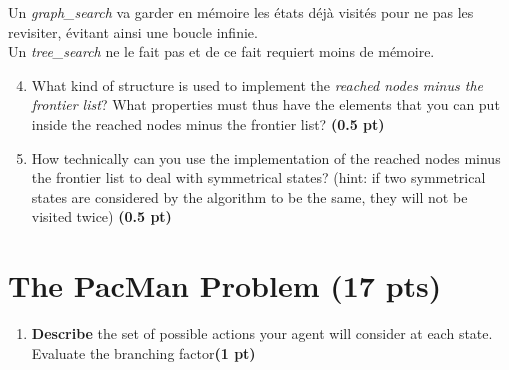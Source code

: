 \documentclass[11pt,a4paper]{../template/report}
\begin{document}
\begin{answer}
Un \textit{graph\_search} va garder en mémoire les états déjà visités pour ne pas les revisiter, évitant ainsi une boucle infinie. \\
Un \textit{tree\_search} ne le fait pas et de ce fait requiert moins de mémoire.
\end{answer}



\begin{enumerate}
\setcounter{enumi}{3}
    \item What kind of structure is used to implement the \textit{reached nodes minus the frontier list}? What properties must thus have the elements that you can
	put inside the reached nodes minus the frontier list? \textbf{(0.5 pt)}
\end{enumerate}

\begin{answer}
\end{answer}



\begin{enumerate}
\setcounter{enumi}{4}
    \item How technically can you use the implementation of the reached nodes minus the frontier list to deal with symmetrical states? (hint: if two symmetrical states are considered by the algorithm to be the same, they will not be visited twice) \textbf{(0.5 pt)}
\end{enumerate}

\begin{answer}
\end{answer}




\section{The 
PacMan Problem (17 pts)}

\begin{enumerate}
\setcounter{enumi}{1}
\begin{enumerate}
\item \textbf{Describe} the set of possible actions your agent will consider at each state. Evaluate the branching factor\textbf{(1 pt)}
\end{enumerate}
  
\end{enumerate}
\end{document}

